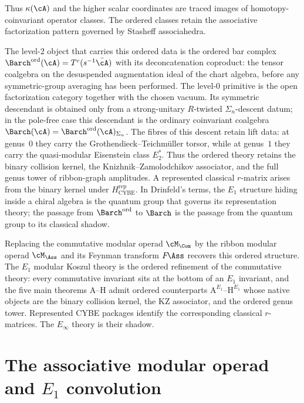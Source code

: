 Thus $\kappa(\cA)$ and the higher scalar coordinates are traced
images of homotopy-coinvariant operator classes.  The ordered classes
retain the associative factorization pattern governed by Stasheff
associahedra.

The level-$2$ object that carries this ordered data is the ordered
bar complex ${\Barch}^{\mathrm{ord}}(\cA) = T^c(s^{-1}\bar\cA)$ with
its deconcatenation coproduct: the tensor coalgebra on the
desuspended augmentation ideal of the chart algebra, before any
symmetric-group averaging has been performed. The level-$0$ primitive
is the open factorization category together with the chosen vacuum.
Its symmetric descendant is obtained only from a
strong-unitary $R$-twisted $\Sigma_n$-descent datum; in the pole-free
case this descendant is the ordinary coinvariant coalgebra
$\Barch(\cA) = {\Barch}^{\mathrm{ord}}(\cA)_{\Sigma_n}$.
The fibres of this descent retain lift data: at genus~$0$ they carry
the Grothendieck--Teichm\"uller torsor, while at genus~$1$ they carry
the quasi-modular Eisenstein class $E_2^*$.  Thus the ordered theory
retains the binary collision kernel, the Knizhnik--Zamolodchikov
associator, and the full genus tower of ribbon-graph amplitudes.  A
represented classical $r$-matrix arises from the binary kernel under
$H_{\mathrm{CYBE}}^{\mathrm{rep}}$.
In Drinfeld's terms, the $E_1$ structure hiding inside a chiral
algebra is the quantum group that governs its representation
theory; the passage from ${\Barch}^{\mathrm{ord}}$ to $\Barch$ is
the passage from the quantum group to its classical shadow.

Replacing the commutative modular operad $\cM_{\Com}$ by the ribbon
modular operad $\cM_{\Ass}$ and its Feynman transform $F\!\Ass$
recovers this ordered structure. The $E_1$ modular Koszul theory is
the ordered refinement of the commutative theory: every
commutative invariant sits at the bottom of an $E_1$ invariant, and
the five main theorems A--H admit ordered counterparts
$\mathrm{A}^{E_1}$--$\mathrm{H}^{E_1}$ whose native objects are the
binary collision kernel, the KZ associator, and the ordered genus
tower.  Represented CYBE packages identify the corresponding
classical $r$-matrices.
The $E_\infty$ theory is their shadow.



\section{The associative modular operad and \texorpdfstring{$E_1$}{E1}
convolution}
\label{sec:e1-associative-modular-operad}

